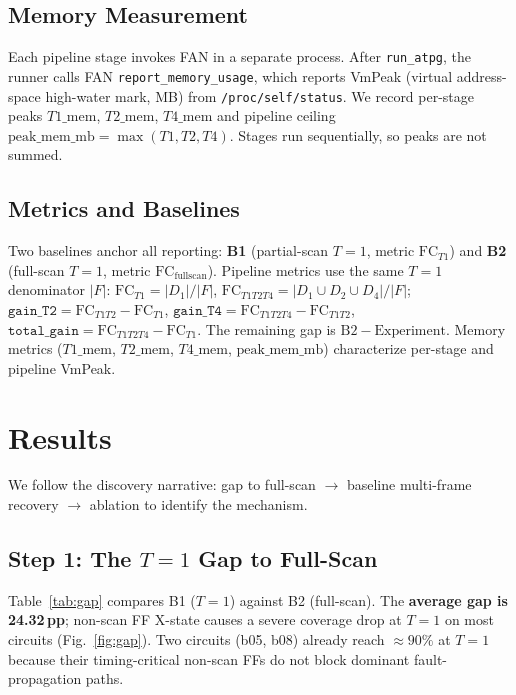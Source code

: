 \documentclass[conference]{IEEEtran}
\begin{document}
\subsection{Memory Measurement}
Each pipeline stage invokes FAN in a separate process. After \texttt{run\_atpg},
the runner calls FAN \texttt{report\_memory\_usage}, which reports VmPeak (virtual
address-space high-water mark, MB) from \texttt{/proc/self/status}. We record
per-stage peaks $T1\_\mathrm{mem}$, $T2\_\mathrm{mem}$, $T4\_\mathrm{mem}$ and
pipeline ceiling $\mathrm{peak\_mem\_mb}{=}\max(T1,T2,T4)$. Stages run
sequentially, so peaks are not summed.

\subsection{Metrics and Baselines}
Two baselines anchor all reporting: \textbf{B1} (partial-scan $T{=}1$, metric
$\mathrm{FC}_{T1}$) and \textbf{B2} (full-scan $T{=}1$, metric
$\mathrm{FC}_{\text{fullscan}}$). Pipeline metrics use the same $T{=}1$
denominator $|F|$: $\mathrm{FC}_{T1}{=}|D_1|/|F|$,
$\mathrm{FC}_{T1T2T4}{=}|D_1{\cup}D_2{\cup}D_4|/|F|$;
$\texttt{gain\_T2}{=}\mathrm{FC}_{T1T2}{-}\mathrm{FC}_{T1}$,
$\texttt{gain\_T4}{=}\mathrm{FC}_{T1T2T4}{-}\mathrm{FC}_{T1T2}$,
$\texttt{total\_gain}{=}\mathrm{FC}_{T1T2T4}{-}\mathrm{FC}_{T1}$. The remaining
gap is $\mathrm{B2}{-}\text{Experiment}$. Memory metrics
($T1\_\mathrm{mem}$, $T2\_\mathrm{mem}$, $T4\_\mathrm{mem}$,
$\mathrm{peak\_mem\_mb}$) characterize per-stage and pipeline VmPeak.

\section{Results}
\label{sec:results}
We follow the discovery narrative: gap to full-scan $\rightarrow$ baseline
multi-frame recovery $\rightarrow$ ablation to identify the mechanism.

\subsection{Step 1: The $T{=}1$ Gap to Full-Scan}
Table~\ref{tab:gap} compares B1 ($T{=}1$) against B2 (full-scan). The
\textbf{average gap is 24.32\,pp}; non-scan FF X-state causes a severe coverage
drop at $T{=}1$ on most circuits (Fig.~\ref{fig:gap}). Two circuits (b05, b08)
already reach ${\approx}90\%$ at $T{=}1$ because their timing-critical non-scan
FFs do not block dominant fault-propagation paths.
\end{document}

